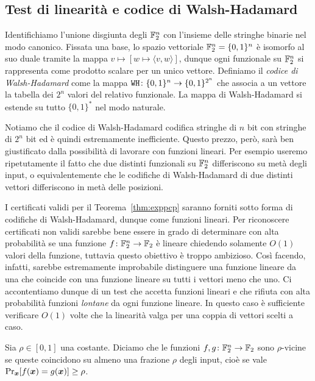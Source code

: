 \subsection{Test di linearità e codice di Walsh-Hadamard}

Identifichiamo l'unione disgiunta degli $\mathbb{F}_2^n$ con l'insieme delle stringhe
binarie nel modo canonico.
Fissata una base, lo spazio vettoriale $\mathbb{F}_2^n = \{0, 1\}^n$ è isomorfo al suo duale
tramite la mappa $v \mapsto [w \mapsto \langle v, w \rangle]$, dunque ogni
funzionale su $\mathbb{F}_2^n$ si rappresenta come prodotto scalare per un
unico vettore. Definiamo il \emph{codice di Walsh-Hadamard} come la mappa
$\mathtt{WH}\colon \{0, 1\}^n \to \{0, 1\}^{2^n}$ che associa a un vettore la
tabella dei $2^n$ valori del relativo funzionale. La mappa di
Walsh-Hadamard si estende su tutto $\{0, 1\}^*$ nel modo naturale.

Notiamo che il codice di Walsh-Hadamard codifica stringhe di $n$ bit con
stringhe di $2^n$ bit ed è quindi estremamente inefficiente. Questo prezzo,
però, sarà ben giustificato dalla possibilità di lavorare con funzioni lineari.
Per esempio useremo ripetutamente il fatto che due distinti
funzionali su $\mathbb{F}_2^n$ differiscono su metà degli input, o equivalentemente
che le codifiche di Walsh-Hadamard di due distinti vettori differiscono in metà
delle posizioni.

I certificati validi per il Teorema~\ref{thm:exppcp} saranno forniti sotto
forma di codifiche di Walsh-Hadamard, dunque come funzioni lineari. Per
riconoscere certificati non validi sarebbe bene essere in grado di
determinare con alta probabilità se una funzione $f\colon \mathbb{F}_2^n \to \mathbb{F}_2$ è lineare
chiedendo solamente $O(1)$ valori della funzione, tuttavia questo
obiettivo è troppo ambizioso. Così facendo, infatti, sarebbe estremamente
improbabile distinguere una funzione lineare da una che coincide con una
funzione lineare su tutti i vettori meno che uno.
Ci accontentiamo dunque di un test che accetta funzioni
lineari e che rifiuta con alta probabilità funzioni \textit{lontane} da
ogni funzione lineare. In questo caso è sufficiente verificare $O(1)$ volte
che la linearità valga per una coppia di vettori scelti a caso.

\begin{definition}
	Sia $\rho \in [0, 1]$ una costante. Diciamo che le funzioni
	$f, g\colon \mathbb{F}_2^n \to \mathbb{F}_2$ sono $\rho$-vicine se queste coincidono su almeno una
	frazione $\rho$ degli input, cioè se vale
	$\Pr_{\bm{x}} [f(\bm{x}) = g(\bm{x})] \ge \rho$.
\end{definition}

